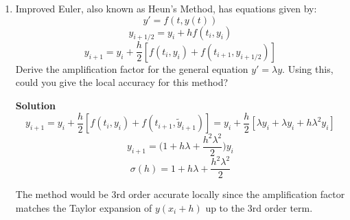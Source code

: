 \documentclass[letterpaper, fontsize=11pt]{scrartcl} %
\numberwithin{equation}{section} %
\numberwithin{figure}{section} %
\numberwithin{table}{section} %
\begin{document}
\begin{enumerate}
\item Improved Euler, also known as Heun's Method, has equations given by: 
$$y' = f(t, y(t))$$
$$y_{i+1/2} = y_i + hf(t_i,y_i)$$
$$y_{i+1} = y_i + \frac{h}{2}[f(t_i,y_i) + f(t_{i+1},y_{i+1/2})]$$ 
Derive the amplification factor for the general equation $y' = \lambda y$. Using this, could you give the local accuracy for this method? \par
\textbf{Solution} \newline
$$y_{i+1} = y_i + \frac{h}{2}[f(t_i,y_i) + f(t_{i+1},\tilde{y}_{i+1})] = y_i + \frac{h}{2}[\lambda y_i + \lambda y_i + h\lambda^2 y_i]$$
$$y_{i+1} = \bigg(1 + h\lambda + \frac{h^2\lambda^2}{2}\bigg)y_i$$
$$\sigma(h) = 1 + h\lambda + \frac{h^2\lambda^2}{2}$$
\par The method would be 3rd order accurate locally since the amplification factor matches the Taylor expansion of $y(x_i+h)$ up to the 3rd order term.

\end{enumerate}

\end{document}
